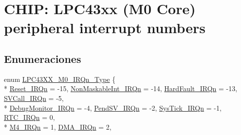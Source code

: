 \hypertarget{group___c_m_s_i_s__43_x_x___m0___i_r_q}{}\section{C\+H\+IP\+: L\+P\+C43xx (M0 Core) peripheral interrupt numbers}
\label{group___c_m_s_i_s__43_x_x___m0___i_r_q}
\subsection*{Enumeraciones}
\begin{DoxyCompactItemize}
\item 
enum \hyperlink{group___c_m_s_i_s__43_x_x___m0___i_r_q_ga402456eb2f4f5b3dc2a53f725eed9485}{L\+P\+C43\+X\+X\+\_\+\+M0\+\_\+\+I\+R\+Qn\+\_\+\+Type} \{ \\*
\hyperlink{group___c_m_s_i_s__43_x_x___m0___i_r_q_gga402456eb2f4f5b3dc2a53f725eed9485a50ad21f2fd0d54d04b390d5a9145889a}{Reset\+\_\+\+I\+R\+Qn} = -\/15, 
\hyperlink{group___c_m_s_i_s__43_x_x___m0___i_r_q_gga402456eb2f4f5b3dc2a53f725eed9485ade177d9c70c89e084093024b932a4e30}{Non\+Maskable\+Int\+\_\+\+I\+R\+Qn} = -\/14, 
\hyperlink{group___c_m_s_i_s__43_x_x___m0___i_r_q_gga402456eb2f4f5b3dc2a53f725eed9485ab1a222a34a32f0ef5ac65e714efc1f85}{Hard\+Fault\+\_\+\+I\+R\+Qn} = -\/13, 
\hyperlink{group___c_m_s_i_s__43_x_x___m0___i_r_q_gga402456eb2f4f5b3dc2a53f725eed9485a4ce820b3cc6cf3a796b41aadc0cf1237}{S\+V\+Call\+\_\+\+I\+R\+Qn} = -\/5, 
\\*
\hyperlink{group___c_m_s_i_s__43_x_x___m0___i_r_q_gga402456eb2f4f5b3dc2a53f725eed9485a8e033fcef7aed98a31c60a7de206722c}{Debug\+Monitor\+\_\+\+I\+R\+Qn} = -\/4, 
\hyperlink{group___c_m_s_i_s__43_x_x___m0___i_r_q_gga402456eb2f4f5b3dc2a53f725eed9485a03c3cc89984928816d81793fc7bce4a2}{Pend\+S\+V\+\_\+\+I\+R\+Qn} = -\/2, 
\hyperlink{group___c_m_s_i_s__43_x_x___m0___i_r_q_gga402456eb2f4f5b3dc2a53f725eed9485a6dbff8f8543325f3474cbae2446776e7}{Sys\+Tick\+\_\+\+I\+R\+Qn} = -\/1, 
\hyperlink{group___c_m_s_i_s__43_x_x___m0___i_r_q_gga402456eb2f4f5b3dc2a53f725eed9485adcc0f2770f7f57f75fac3d8bcac0e858}{R\+T\+C\+\_\+\+I\+R\+Qn} = 0, 
\\*
\hyperlink{group___c_m_s_i_s__43_x_x___m0___i_r_q_gga402456eb2f4f5b3dc2a53f725eed9485afc37743619ad5c0be7c478e876966ee1}{M4\+\_\+\+I\+R\+Qn} = 1, 
\hyperlink{group___c_m_s_i_s__43_x_x___m0___i_r_q_gga402456eb2f4f5b3dc2a53f725eed9485a4968eb85558b7cd25e0f0fa1b839f881}{D\+M\+A\+\_\+\+I\+R\+Qn} = 2, 

\end{DoxyCompactItemize}
